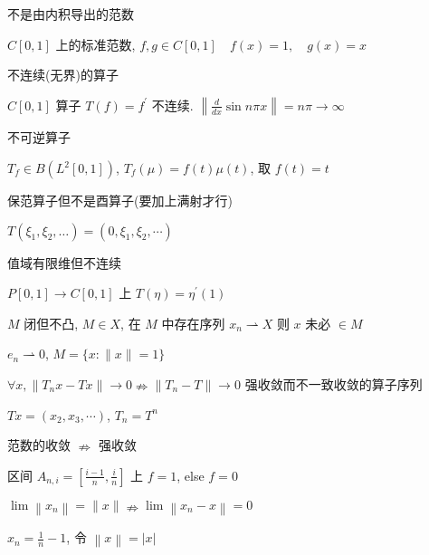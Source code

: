 \documentclass[10pt, twocolumn]{yerbaformat}
\begin{document}
\begin{example}
    不是由内积导出的范数
\end{example}

$C[0, 1]$ 上的标准范数, $f, g \in C[0,1] \quad f(x)=1, \quad g(x)=x$

\begin{example}
    不连续(无界)的算子 
\end{example}

$C[0, 1]$ 算子 $T(f)=f^{\prime}$ 不连续. $\left\|\frac{d}{d x} \sin n \pi x\right\|=n \pi \rightarrow \infty$

\begin{example}
    不可逆算子
\end{example}

$T_{f} \in B\left(L^{2}[0,1]\right)$, $T_{f}(\mu)=f(t) \mu(t)$, 取 $f(t)=t$

\begin{example}
    保范算子但不是酉算子(要加上满射才行)
\end{example}

$T\left(\xi_{1}, \xi_{2}, \ldots\right)=\left(0, \xi_{1},\xi_{2}, \cdots\right)$

\begin{example}
    值域有限维但不连续
\end{example}

$P[0, 1] \rightarrow C[0, 1]$ 上 $T(\eta)=\eta^{\prime}(1)$

\begin{example}
    $M$ 闭但不凸, $M \in X$, 在 $M$ 中存在序列 $x_{n} \rightharpoonup X$ 则 $x$ 未必 $\in M$
\end{example}

$e_{n} \rightharpoonup  0$, $M=\{x:\|x\|=1\}$

\begin{example}
    $\forall x,\left\|T_{n} x-T x\right\| \rightarrow 0 \nRightarrow \left\|T_{n}-T\right\| \rightarrow 0$ 强收敛而不一致收敛的算子序列
\end{example}

$ T x=\left(x_{2}, x_{3}, \cdots\right)$, $T_{n}=T^{n}$

\begin{example}
    范数的收敛 $\nRightarrow$ 强收敛
\end{example}

区间 $A_{n, i}=\left[\frac{i-1}{n}, \frac{i}{n}\right]$ 上 $f=1$, else $f=0$ 

\begin{example}
    $\lim \left\|x_{n}\right\|=\|x\| \nRightarrow \lim \left\|x_{n}-x\right\|=0$
\end{example}

$x_{n}=\frac{1}{n}-1$, 令 $\left\|x \right\|=|x|$
\end{document}
